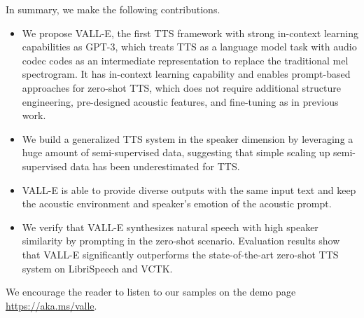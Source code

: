 \documentclass{article}
\theoremstyle{plain}
\theoremstyle{definition}
\theoremstyle{remark}
\newcommand\our{\textsc{VALL-E}}
\begin{document}
In summary, we make the following contributions.
\begin{itemize}
  \item We propose \our{}, the first TTS framework with strong in-context learning capabilities as GPT-3, which treats TTS as a language model task with audio codec codes as an intermediate representation to replace the traditional mel spectrogram. It has in-context learning capability and enables prompt-based approaches for zero-shot TTS, which does not require additional structure engineering, pre-designed acoustic features, and fine-tuning as in previous work.  
  \item We  build a generalized TTS system in the speaker dimension by leveraging a huge amount of semi-supervised data, suggesting that simple scaling up semi-supervised data has been underestimated for TTS. 
  \item \our{} is able to provide  diverse outputs with the same input text and keep the acoustic environment and speaker's emotion of the acoustic prompt. 
  \item  We verify that \our{} synthesizes natural speech with high speaker similarity by prompting in the zero-shot scenario. Evaluation results show that \our{}  significantly outperforms the state-of-the-art zero-shot TTS system on LibriSpeech and VCTK. 
\end{itemize}
We encourage the reader to listen to our samples on the demo page \url{https://aka.ms/valle}.



\end{document}
